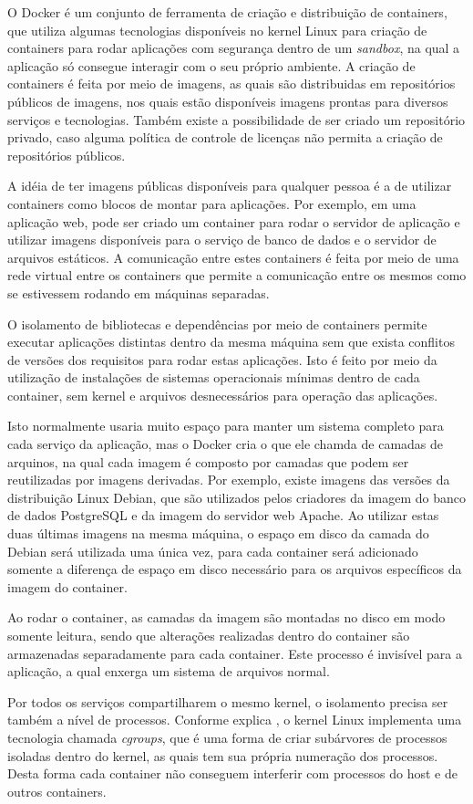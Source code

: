 O Docker é um conjunto de ferramenta de criação e distribuição de containers,
que utiliza algumas tecnologias disponíveis no kernel Linux para criação de
containers para rodar aplicações com segurança dentro de um \emph{sandbox},
na qual a aplicação só consegue interagir com o seu próprio ambiente. A criação
de containers é feita por meio de imagens, as quais são distribuidas em
repositórios públicos de imagens, nos quais estão disponíveis imagens prontas
para diversos serviços e tecnologias. Também existe a possibilidade de ser
criado um repositório privado, caso alguma política de controle de licenças
não permita a criação de repositórios públicos.

A idéia de ter imagens públicas disponíveis para qualquer pessoa é a de
utilizar containers como blocos de montar para aplicações. Por exemplo,
em uma aplicação web, pode ser criado um container para rodar o servidor de
aplicação e utilizar imagens disponíveis para o serviço de banco de dados e
o servidor de arquivos estáticos. A comunicação entre estes containers é feita
por meio de uma rede virtual entre os containers que permite a comunicação
entre os mesmos como se estivessem rodando em máquinas separadas.

O isolamento de bibliotecas e dependências por meio de containers permite
executar aplicações distintas dentro da mesma máquina sem que exista
conflitos de versões dos requisitos para rodar estas aplicações. Isto é feito
por meio da utilização de instalações de sistemas operacionais mínimas dentro
de cada container, sem kernel e arquivos desnecessários para operação das
aplicações.

Isto normalmente usaria muito espaço para manter um sistema completo para
cada serviço da aplicação, mas o Docker cria o que ele chamda de camadas
de arquinos, na qual cada imagem é composto por camadas que podem ser
reutilizadas por imagens derivadas. Por exemplo, existe imagens das
versões da distribuição Linux Debian, que são utilizados pelos criadores da
imagem do banco de dados PostgreSQL e da imagem do servidor web Apache.
Ao utilizar estas duas últimas imagens na mesma máquina, o espaço em disco
da camada do Debian será utilizada uma única vez, para cada container será
adicionado somente a diferença de espaço em disco necessário para os arquivos
específicos da imagem do container.

Ao rodar o container, as camadas da imagem são montadas no disco em modo
somente leitura, sendo que alterações realizadas dentro do container são
armazenadas separadamente para cada container. Este processo é invisível para
a aplicação, a qual enxerga um sistema de arquivos normal.

Por todos os serviços compartilharem o mesmo kernel, o isolamento precisa
ser também a nível de processos. Conforme explica ,
o kernel Linux implementa uma tecnologia chamada \emph{cgroups}, que é uma
forma de criar subárvores de processos isoladas dentro do kernel, as quais
tem sua própria numeração dos processos. Desta forma cada container não
conseguem interferir com processos do host e de outros containers.
